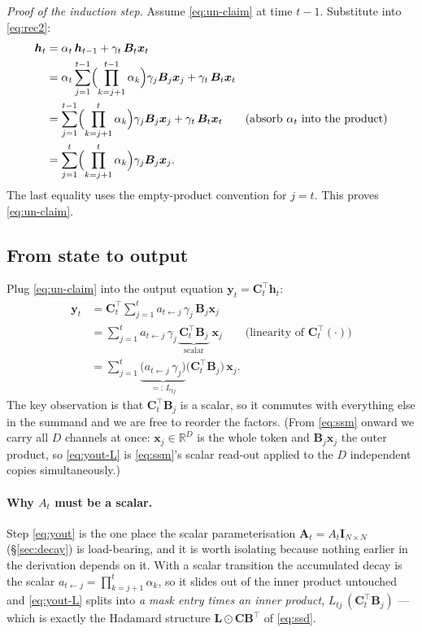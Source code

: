 \documentclass[11pt,a4paper]{article}
\begin{document}
\emph{Proof of the induction step.} Assume \eqref{eq:un-claim} at
time $t-1$. Substitute into \eqref{eq:rec2}:
\begin{align}
  \bm{h}_t
   &= \alpha_t\,\bm{h}_{t-1} + \gamma_t\,\bm{B}_t\bm{x}_t \\
   &= \alpha_t \sum_{j=1}^{t-1}
        \Bigl(\prod_{k=j+1}^{t-1}\alpha_k\Bigr)\gamma_j\bm{B}_j\bm{x}_j
        + \gamma_t\,\bm{B}_t\bm{x}_t \\
   &= \sum_{j=1}^{t-1}
        \Bigl(\prod_{k=j+1}^{t}\alpha_k\Bigr)\gamma_j\bm{B}_j\bm{x}_j
        + \gamma_t\,\bm{B}_t\bm{x}_t
        \qquad\text{(absorb $\alpha_t$ into the product)}\\
   &= \sum_{j=1}^{t}
        \Bigl(\prod_{k=j+1}^{t}\alpha_k\Bigr)\gamma_j\bm{B}_j\bm{x}_j.
\end{align}
The last equality uses the empty-product convention for $j=t$. This
proves \eqref{eq:un-claim}.

\subsection{From state to output}
\label{sec:state-to-output}

Plug \eqref{eq:un-claim} into the output equation
$\bm{y}_t = \bm{C}_t^\top\bm{h}_t$:
\begin{align}
  \bm{y}_t
   &= \bm{C}_t^\top \sum_{j=1}^{t}
        a_{t\leftarrow j}\,\gamma_j\,\bm{B}_j\bm{x}_j \\
   &= \sum_{j=1}^{t}
        a_{t\leftarrow j}\,\gamma_j\,
        \underbrace{\bm{C}_t^\top \bm{B}_j}_{\text{scalar}}\;\bm{x}_j
        \qquad\text{(linearity of $\bm{C}_t^\top(\cdot)$)} \label{eq:yout} \\
   &= \sum_{j=1}^{t}
        \underbrace{\bigl(a_{t\leftarrow j}\,\gamma_j\bigr)}_{=:\,L_{tj}}
        \bigl(\bm{C}_t^\top \bm{B}_j\bigr)\,\bm{x}_j. \label{eq:yout-L}
\end{align}
The key observation is that $\bm{C}_t^\top\bm{B}_j$ is a scalar, so it
commutes with everything else in the summand and we are free to reorder
the factors. (From \eqref{eq:ssm} onward we carry all $D$ channels at
once: $\bm{x}_j\in\mathbb{R}^{D}$ is the whole token and
$\bm{B}_j\bm{x}_j$ the outer product, so \eqref{eq:yout-L} is
\eqref{eq:ssm}'s scalar read-out applied to the $D$ independent copies
simultaneously.)

\paragraph{Why $A_t$ must be a scalar.} Step \eqref{eq:yout} is the one
place the scalar parameterisation
$\bm{A}_t = A_t\bm{I}_{N\times N}$ (\S\ref{sec:decay}) is load-bearing,
and it is worth isolating because nothing earlier in the derivation
depends on it. With a scalar transition the accumulated decay is the
scalar $a_{t\leftarrow j}=\prod_{k=j+1}^{t}\alpha_k$, so it slides out
of the inner product untouched and \eqref{eq:yout-L} splits into
\emph{a mask entry times an inner product}, $L_{tj}\,(\bm{C}_t^\top\bm{B}_j)$
--- which is exactly the Hadamard structure
$\bm{L}\odot\bm{C}\bm{B}^\top$ of \eqref{eq:ssd}.
\end{document}
